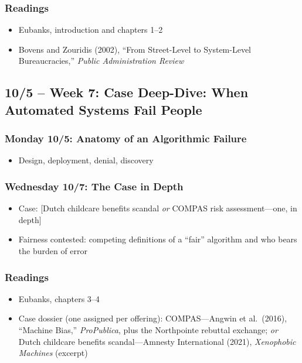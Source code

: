 \documentclass[12pt]{article}
\begin{document}
    \subsubsection*{Readings}
        \begin{itemize}
            \item Eubanks, introduction and chapters 1--2
            \item Bovens and Zouridis (2002), ``From Street-Level to System-Level Bureaucracies,'' \emph{Public Administration Review}
        \end{itemize}

\subsection*{10/5 -- Week 7: Case Deep-Dive: When Automated Systems Fail People}
    \subsubsection*{Monday 10/5: Anatomy of an Algorithmic Failure}
        \begin{itemize}
            \item Design, deployment, denial, discovery
        \end{itemize}
    \subsubsection*{Wednesday 10/7: The Case in Depth}
        \begin{itemize}
            \item Case: [Dutch childcare benefits scandal \emph{or} COMPAS risk assessment---one, in depth]
            \item Fairness contested: competing definitions of a ``fair'' algorithm and who bears the burden of error
        \end{itemize}
    \subsubsection*{Readings}
        \begin{itemize}
            \item Eubanks, chapters 3--4
            \item Case dossier (one assigned per offering): COMPAS---Angwin et al.\ (2016), ``Machine Bias,'' \emph{ProPublica}, plus the Northpointe rebuttal exchange; \emph{or} Dutch childcare benefits scandal---Amnesty International (2021), \emph{Xenophobic Machines} (excerpt)
        \end{itemize}
\end{document}
